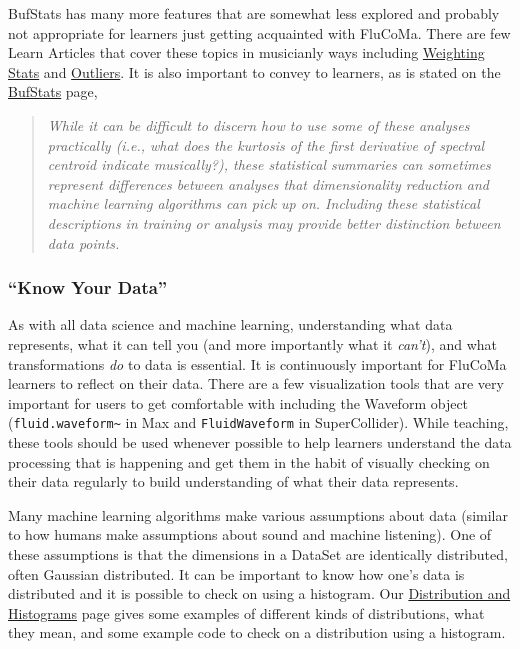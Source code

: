 \documentclass{article}
\begin{document}
BufStats has many more features that are somewhat less explored and
probably not appropriate for learners just getting acquainted with
FluCoMa. There are few Learn Articles that cover these topics in
musicianly ways including
\href{https://learn.flucoma.org/learn/weighting-stats/}{Weighting Stats}
and \href{https://learn.flucoma.org/learn/outliers/}{Outliers}. It is
also important to convey to learners, as is stated on the
\href{https://learn.flucoma.org/reference/bufstats/}{BufStats} page,

\begin{quote}
\emph{While it can be difficult to discern how to use some of these
analyses practically (i.e., what does the kurtosis of the first
derivative of spectral centroid indicate musically?), these statistical
summaries can sometimes represent differences between analyses that
dimensionality reduction and machine learning algorithms can pick up on.
Including these statistical descriptions in training or analysis may
provide better distinction between data points.}
\end{quote}

\subsubsection{``Know Your Data''}

As with all data science and machine learning, understanding what data
represents, what it can tell you (and more importantly what it
\emph{can't}), and what transformations \emph{do} to data is essential.
It is continuously important for FluCoMa learners to reflect on their
data. There are a few visualization tools that are very important for
users to get comfortable with including the Waveform object
(\texttt{fluid.waveform\textasciitilde{}} in Max and
\texttt{FluidWaveform} in SuperCollider). While teaching, these tools
should be used whenever possible to help learners understand the data
processing that is happening and get them in the habit of visually
checking on their data regularly to build understanding of what their
data represents.

Many machine learning algorithms make various assumptions about data
(similar to how humans make assumptions about sound and machine
listening). One of these assumptions is that the dimensions in a DataSet
are identically distributed, often Gaussian distributed. It can be
important to know how one's data is distributed and it is possible to
check on using a histogram. Our
\href{https://learn.flucoma.org/learn/distribution/}{Distribution and
Histograms} page gives some examples of different kinds of
distributions, what they mean, and some example code to check on a
distribution using a histogram.
\end{document}
